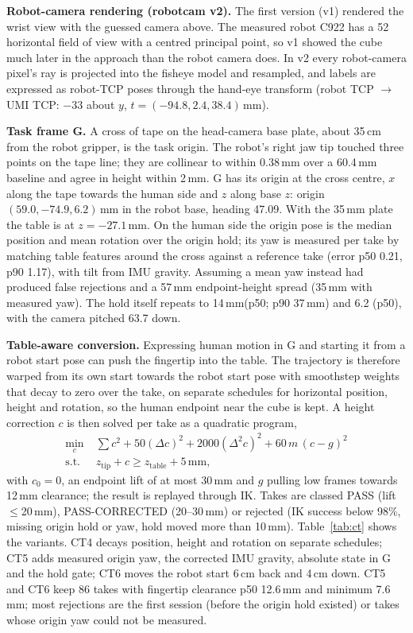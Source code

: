 \documentclass[conference,10pt]{IEEEtran}
\newcommand{\mm}{\,mm\xspace}
\begin{document}
\textbf{Robot-camera rendering (robotcam v2).} The first version (v1) rendered the wrist view with the guessed camera above. The
measured robot C922 has a 52\textdegree{} horizontal field of view with a centred principal point, so v1 showed the cube much later
in the approach than the robot camera does. In v2 every robot-camera pixel's ray is projected into the fisheye model and resampled,
and labels are expressed as robot-TCP poses through the hand-eye transform (robot TCP $\to$ UMI TCP: $-33$\textdegree{} about $y$,
$t=(-94.8, 2.4, 38.4)$\mm).

\textbf{Task frame G.} A cross of tape on the head-camera base plate, about 35\,cm from the robot gripper, is the task origin. The
robot's right jaw tip touched three points on the tape line; they are collinear to within 0.38\mm over a 60.4\mm baseline and agree
in height within 2\mm. G has its origin at the cross centre, $x$ along the tape towards the human side and $z$ along base $z$:
origin $(59.0, -74.9, 6.2)$\mm in the robot base, heading 47.09\textdegree. With the 35\mm plate the table is at $z=-27.1$\mm. On the
human side the origin pose is the median position and mean rotation over the origin hold; its yaw is measured per take by matching
table features around the cross against a reference take (error p50 0.21\textdegree, p90 1.17\textdegree), with tilt from IMU
gravity. Assuming a mean yaw instead had produced false rejections and a 57\mm endpoint-height spread (35\mm with measured yaw). The
hold itself repeats to 14\mm (p50; p90 37\mm) and 6.2\textdegree{} (p50), with the camera pitched 63.7\textdegree{} down.

\textbf{Table-aware conversion.} Expressing human motion in G and starting it from a robot start pose can push the fingertip into the
table. The trajectory is therefore warped from its own start towards the robot start pose with smoothstep weights that decay to
zero over the take, on separate schedules for horizontal position, height and rotation, so the human endpoint near the cube is kept.
A height correction $c$ is then solved per take as a quadratic program,
\begin{equation}
\begin{aligned}
\min_c\;& \textstyle\sum c^2+50(\Delta c)^2+2000(\Delta^2 c)^2+60\,m\,(c-g)^2\\
\text{s.t.}\;& z_\text{tip}+c\ge z_\text{table}+5\,\text{mm},
\end{aligned}
\end{equation}
with $c_0=0$, an endpoint lift of at most 30\mm and $g$ pulling low frames towards 12\mm clearance; the result is replayed through
IK. Takes are classed PASS (lift $\le$20\mm), PASS-CORRECTED (20--30\mm) or rejected (IK success below 98\%, missing origin hold or
yaw, hold moved more than 10\mm). Table~\ref{tab:ct} shows the variants. CT4 decays position, height and rotation on separate
schedules; CT5 adds measured origin yaw, the corrected IMU gravity, absolute state in G and the hold gate; CT6 moves the robot start
6\,cm back and 4\,cm down. CT5 and CT6 keep 86 takes with fingertip clearance p50 12.6\mm and minimum 7.6\mm; most rejections are the
first session (before the origin hold existed) or takes whose origin yaw could not be measured.
\end{document}
